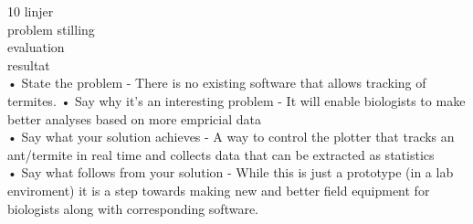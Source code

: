 
10 linjer \\
problem stilling \\
evaluation \\
resultat \\

• State the problem - There is no existing software that allows tracking of termites. %
• Say why it’s an interesting problem - It will enable biologists to make better analyses based on more empricial data \\
• Say what your solution achieves - A way to control the plotter that tracks an ant/termite in real time and collects data that can be extracted as statistics\\
• Say what follows from your solution - While this is just a prototype (in a lab enviroment) it is a step towards making new and better field equipment for biologists along with corresponding software.\\

